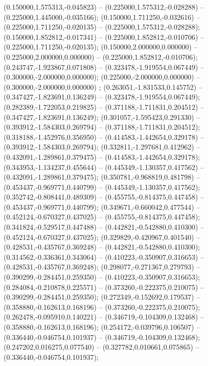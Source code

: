  (0.150000,1.575313,-0.045823) -- (0.225000,1.575312,-0.028288) -- (0.225000,1.445000,-0.035166);
 (0.150000,1.711250,-0.032616) -- (0.225000,1.711250,-0.020135) -- (0.225000,1.575312,-0.028288);
 (0.150000,1.852812,-0.017341) -- (0.225000,1.852812,-0.010706) -- (0.225000,1.711250,-0.020135);
 (0.150000,2.000000,0.000000) -- (0.225000,2.000000,0.000000) -- (0.225000,1.852812,-0.010706);
 (0.243747,-1.923867,0.071808) -- (0.323478,-1.919554,0.067449) -- (0.300000,-2.000000,0.000000);
 (0.225000,-2.000000,0.000000) -- (0.300000,-2.000000,0.000000) ;
 (0.263051,-1.831533,0.145752) -- (0.347427,-1.823691,0.136249) -- (0.323478,-1.919554,0.067449);
 (0.282389,-1.722053,0.219825) -- (0.371188,-1.711831,0.204512) -- (0.347427,-1.823691,0.136249);
 (0.301057,-1.595423,0.291330) -- (0.393912,-1.584303,0.269794) -- (0.371188,-1.711831,0.204512);
 (0.318188,-1.452976,0.356950) -- (0.414583,-1.442654,0.329178) -- (0.393912,-1.584303,0.269794);
 (0.332811,-1.297681,0.412962) -- (0.432091,-1.289861,0.379475) -- (0.414583,-1.442654,0.329178);
 (0.343953,-1.134237,0.455644) -- (0.445349,-1.130357,0.417562) -- (0.432091,-1.289861,0.379475);
 (0.350781,-0.968819,0.481798) -- (0.453437,-0.969771,0.440799) -- (0.445349,-1.130357,0.417562);
 (0.352742,-0.808441,0.489309) -- (0.455755,-0.814375,0.447458) -- (0.453437,-0.969771,0.440799);
 (0.349671,-0.660042,0.477544) -- (0.452124,-0.670327,0.437025) -- (0.455755,-0.814375,0.447458);
 (0.341824,-0.529517,0.447488) -- (0.442821,-0.542880,0.410300) -- (0.452124,-0.670327,0.437025);
 (0.329829,-0.420967,0.401540) -- (0.428531,-0.435767,0.369248) -- (0.442821,-0.542880,0.410300);
 (0.314562,-0.336361,0.343064) -- (0.410223,-0.350907,0.316653) -- (0.428531,-0.435767,0.369248);
 (0.298077,-0.271367,0.279793) -- (0.390299,-0.284451,0.259350) -- (0.410223,-0.350907,0.316653);
 (0.284084,-0.210878,0.225571) -- (0.373260,-0.222375,0.210075) -- (0.390299,-0.284451,0.259350);
 (0.272349,-0.152692,0.179537) -- (0.358880,-0.162613,0.168196) -- (0.373260,-0.222375,0.210075);
 (0.262478,-0.095910,0.140221) -- (0.346719,-0.104309,0.132468) -- (0.358880,-0.162613,0.168196);
 (0.254172,-0.039796,0.106507) -- (0.336440,-0.046754,0.101937) -- (0.346719,-0.104309,0.132468);
 (0.247202,0.016275,0.077540) -- (0.327782,0.010661,0.075865) -- (0.336440,-0.046754,0.101937);

